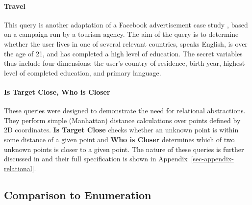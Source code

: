 \paragraph{Travel} This query is another adaptation of a
Facebook advertisement case study \cite{visitbritain-case-study},
based on a campaign run by a tourism agency. The aim of the query is
to determine whether the user lives in one of several relevant
countries, speaks English, is over the age of 21, and has completed a high
level of education. The secret variables thus include four dimensions:
the user's country of residence, birth year, highest level
of completed education, and primary language.

\paragraph{Is Target Close, Who is Closer} These queries were designed to
demonstrate the need for relational abstractions. They perform simple
(Manhattan) distance calculations over points defined by 2D
coordinates. \textbf{Is Target Close} checks whether an unknown point is
within some distance of a given point and \textbf{Who is Closer}
determines which of two unknown points is closer to a given point. The
nature of these queries is further discussed in 
and their full specification is shown in
Appendix~\ref{sec-appendix-relational}.

\subsection{Comparison to Enumeration} \label{sec:enum}

